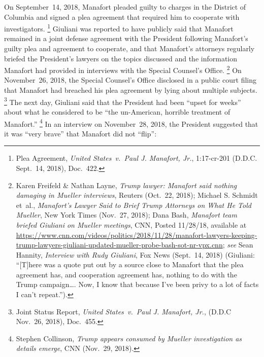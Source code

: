 On September~14, 2018, Manafort pleaded guilty to charges in the District of Columbia and signed a plea agreement that required him to cooperate with investigators.%
\footnote{Plea Agreement, \textit{United States~v.\ Paul J. Manafort, Jr.}, 1:17-cr-201 (D.D.C. Sept.~14, 2018), Doc.~422.}
Giuliani was reported to have publicly said that Manafort remained in a joint defense agreement with the President following Manafort's guilty plea and agreement to cooperate, and that Manafort's attorneys regularly briefed the President's lawyers on the topics discussed and the information Manafort had provided in interviews with the Special Counsel's Office.%
\footnote{Karen Freifeld \& Nathan Layne, \textit{Trump lawyer: Manafort said nothing damaging in Mueller interviews}, Reuters (Oct.~22, 2018);
Michael S. Schmidt et~al., \textit{Manafort's Lawyer Said to Brief Trump Attorneys on What He Told Mueller}, New York Times (Nov.~27, 2018);
Dana Bash, \textit{Manafort team briefed Giuliani on Mueller meetings}, CNN, Posted 11/28/18, available at
\url{https://www.cnn.com/videos/politics/2018/11/28/manafort-lawyers-keeping-trump-lawyers-giuliani-updated-mueller-probe-bash-sot-nr-vpx.cnn};
\textit{see} Sean Hannity, \textit{Interview with Rudy Giuliani}, Fox News (Sept.~14, 2018) (Giuliani: ``[T]here was a quote put out by a source close to Manafort that the plea agreement has, and cooperation agreement has, nothing to do with the Trump campaign\dots.
Now, I know that because I've been privy to a lot of facts I can't repeat.'').}
On November~26, 2018, the Special Counsel's Office disclosed in a public court filing that Manafort had breached his plea agreement by lying about multiple subjects.%
\footnote{Joint Status Report, \textit{United States~v.\ Paul J. Manafort, Jr.}, (D.D.C Nov.~26, 2018), Doc.~455.}
The next day, Giuliani said that the President had been ``upset for weeks'' about what he considered to be ``the un-American, horrible treatment of Manafort.''%
\footnote{Stephen Collinson, \textit{Trump appears consumed by Mueller investigation as details emerge}, CNN (Nov.~29, 2018).}
In an interview on November~28, 2018, the President suggested that it was ``very brave'' that Manafort did not ``flip'':

